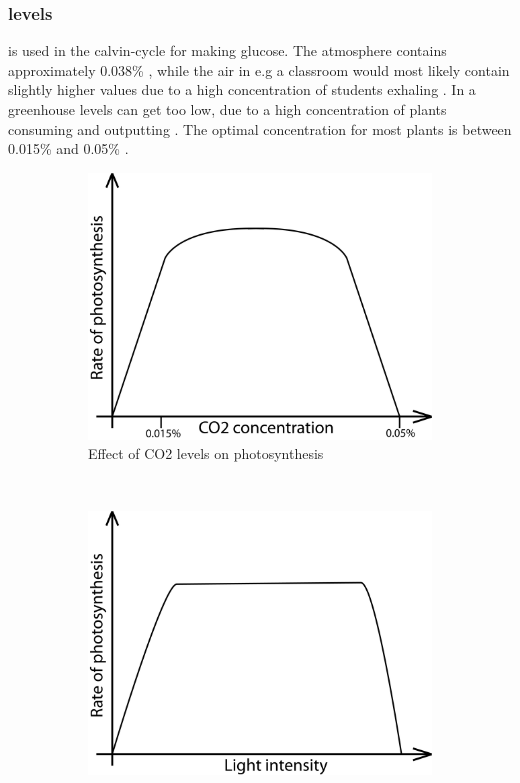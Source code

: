 \subsubsection{ levels}
 is used in the calvin-cycle for making glucose. The atmosphere contains approximately 0.038\% , while the air in e.g a classroom would most likely contain slightly higher values due to a high concentration of students exhaling . In a greenhouse  levels can get too low, due to a high concentration of plants consuming  and outputting . The optimal concentration for most plants is between 0.015\% and 0.05\% \citep{bios}. 


\begin{figure}
        \centering
        \begin{subfigure}[b]{0.45\textwidth}
                \includegraphics[width=\textwidth]{img/photosynthesis/co2.png}
                \caption{Effect of CO2 levels on photosynthesis}
                \label{fig:co2levels}
        \end{subfigure}
        ~~
        \begin{subfigure}[b]{0.45\textwidth}
                \includegraphics[width=\textwidth]{img/photosynthesis/light_intensity.png}

\end{subfigure}
\end{figure}
